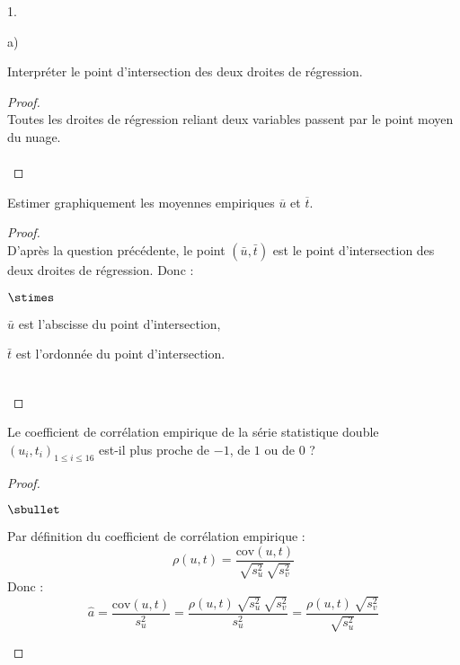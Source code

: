 \documentclass[11pt]{article}%
\begin{document}
\begin{noliste}{1.}
\begin{noliste}{a)}
  
  
  \newpage
  
  
  
  \item Interpréter le point d'intersection des deux droites de 
  régression.
  
  \begin{proof}~\\
   Toutes les droites de régression reliant deux variables passent
   par le point moyen du nuage.~\\[-.8cm]
   ~\\[-1cm]
  \end{proof}

  
  \item Estimer graphiquement les moyennes empiriques $\overline{u}$ et 
  $\overline{t}$.
  
  \begin{proof}~\\
   D'après la question précédente, le point $(\bar{u}, \bar{t})$ 
   est le point d'intersection des deux droites de régression. Donc :
   \begin{noliste}{$\stimes$}
    \item $\bar{u}$ est l'abscisse du point d'intersection,
    \item $\bar{t}$ est l'ordonnée du point d'intersection.
   \end{noliste}
   ~\\[-1cm]
  \end{proof}
  
  \item Le coefficient de corrélation empirique de la série statistique 
  double $(u_i,t_i)_{1 \leq i \leq 16}$ est-il plus 
  proche de $-1$, de $1$ ou de $0$ ?
  
  \begin{proof}~
   \begin{noliste}{$\sbullet$}
    \item Par définition du coefficient de corrélation empirique :
    \[
     \rho(u,t) = \dfrac{\text{cov}(u,t)}{\sqrt{s_u^2} \, \sqrt{s_v^2}}
    \]
    Donc :
    \[
     \hat{a} = \dfrac{\text{cov}(u,t)}{s_u^2} = 
     \dfrac{\rho(u,t) \, \sqrt{s_u^2} \, \sqrt{s_v^2}}{s_u^2} = 
     \dfrac{\rho(u,t) \, \sqrt{s_v^2}}{\sqrt{s_u^2}}
    \]
   

\end{noliste}
\end{proof}
\end{noliste}
\end{noliste}
\end{document}
